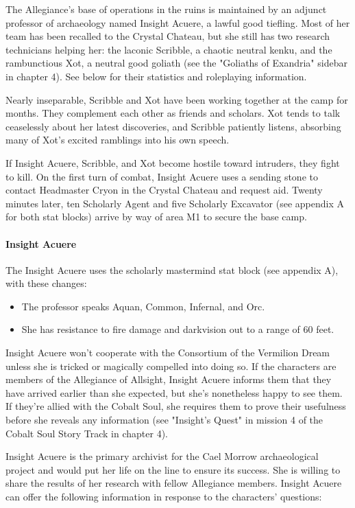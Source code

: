 \documentclass[10pt,a4paper,twoside,twocolumn,openany,nodeprecatedcode]{dndbook}
\begin{document}
The Allegiance's base of operations in the ruins is maintained by an adjunct professor of archaeology named Insight Acuere, a lawful good tiefling. Most of her team has been recalled to the Crystal Chateau, but she still has two research technicians helping her: the laconic Scribble, a chaotic neutral kenku, and the rambunctious Xot, a neutral good goliath (see the "Goliaths of Exandria" sidebar in chapter 4). See below for their statistics and roleplaying information.

Nearly inseparable, Scribble and Xot have been working together at the camp for months. They complement each other as friends and scholars. Xot tends to talk ceaselessly about her latest discoveries, and Scribble patiently listens, absorbing many of Xot's excited ramblings into his own speech.

If Insight Acuere, Scribble, and Xot become hostile toward intruders, they fight to kill. On the first turn of combat, Insight Acuere uses a sending stone to contact Headmaster Cryon in the Crystal Chateau and request aid. Twenty minutes later, ten Scholarly Agent and five Scholarly Excavator (see appendix A for both stat blocks) arrive by way of area M1 to secure the base camp.

\paragraph{Insight Acuere}
The Insight Acuere uses the scholarly mastermind stat block (see appendix A), with these changes:

\begin{itemize}
\item The professor speaks Aquan, Common, Infernal, and Orc.
\item She has resistance to fire damage and darkvision out to a range of 60 feet.
\end{itemize}

Insight Acuere won't cooperate with the Consortium of the Vermilion Dream unless she is tricked or magically compelled into doing so. If the characters are members of the Allegiance of Allsight, Insight Acuere informs them that they have arrived earlier than she expected, but she's nonetheless happy to see them. If they're allied with the Cobalt Soul, she requires them to prove their usefulness before she reveals any information (see "Insight's Quest" in mission 4 of the Cobalt Soul Story Track in chapter 4).

Insight Acuere is the primary archivist for the Cael Morrow archaeological project and would put her life on the line to ensure its success. She is willing to share the results of her research with fellow Allegiance members. Insight Acuere can offer the following information in response to the characters' questions:
\end{document}
